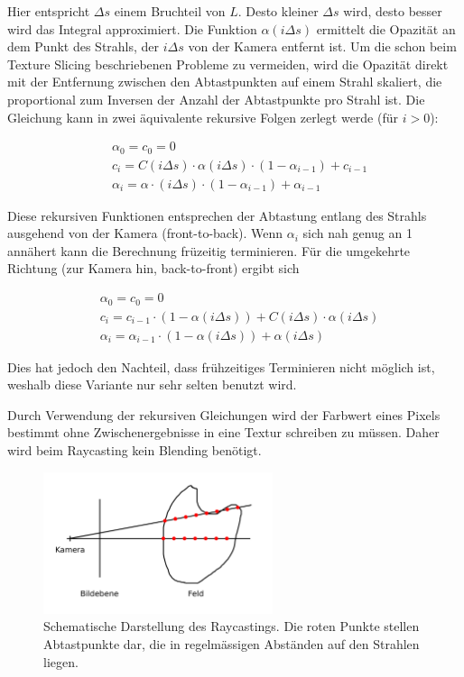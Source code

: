 \documentclass[a4paper,fontsize=12pt,toc=bib,halfparskip,ngerman]{scrartcl}
\begin{document}
Hier entspricht $\Delta s$ einem Bruchteil von $L$. Desto kleiner $\Delta s$ wird, desto besser wird das Integral approximiert. Die Funktion $\alpha(i \Delta s)$ ermittelt die Opazit\"at an dem Punkt des Strahls, der $i \Delta s$ von der Kamera entfernt ist. Um die schon beim Texture Slicing beschriebenen Probleme zu vermeiden, wird die Opazit\"at direkt mit der Entfernung zwischen den Abtastpunkten auf einem Strahl skaliert, die proportional zum Inversen der Anzahl der Abtastpunkte pro Strahl ist.
Die Gleichung kann in zwei \"aquivalente rekursive Folgen zerlegt werde (f\"ur $i > 0$):

\begin{align}
&\alpha_0 = c_0 = 0\\
&c_i = C(i\Delta s)\cdot\alpha(i\Delta s)\cdot(1-\alpha_{i-1}) + c_{i-1} \label{RaycastingFormula1}\\
&\alpha_i = \alpha\cdot(i \Delta s)\cdot(1-\alpha_{i-1}) + \alpha_{i-1} \label{RaycastingFormula2}
\end{align} 

Diese rekursiven Funktionen entsprechen der Abtastung entlang des Strahls ausgehend von der Kamera (front-to-back). Wenn $\alpha_i$ sich nah genug an 1 ann\"ahert kann die Berechnung fr\"uzeitig terminieren. F\"ur die umgekehrte Richtung (zur Kamera hin, back-to-front) ergibt sich

\begin{align}
&\alpha_0 = c_0 = 0\\
&c_i = c_{i-1}\cdot(1 - \alpha(i\Delta s)) + C(i\Delta s)\cdot\alpha(i\Delta s)\\
&\alpha_i = \alpha_{i-1}\cdot(1 - \alpha(i\Delta s)) + \alpha(i \Delta s) 
\end{align}

Dies hat jedoch den Nachteil, dass fr\"uhzeitiges Terminieren nicht m\"oglich ist, weshalb diese Variante nur sehr selten benutzt wird.

Durch Verwendung der rekursiven Gleichungen wird der Farbwert eines Pixels bestimmt ohne Zwischenergebnisse in eine Textur schreiben zu m\"ussen. Daher wird beim Raycasting kein Blending ben\"otigt.


\begin{figure}
	\centering
	\includegraphics[width=0.6\textwidth]{pictures/Raycasting}
	\caption{Schematische Darstellung des Raycastings. Die roten Punkte stellen Abtastpunkte dar, die in regelm\"assigen Abst\"anden auf den Strahlen liegen.}
	\label{Raycasting}
\end{figure}
\end{document}
